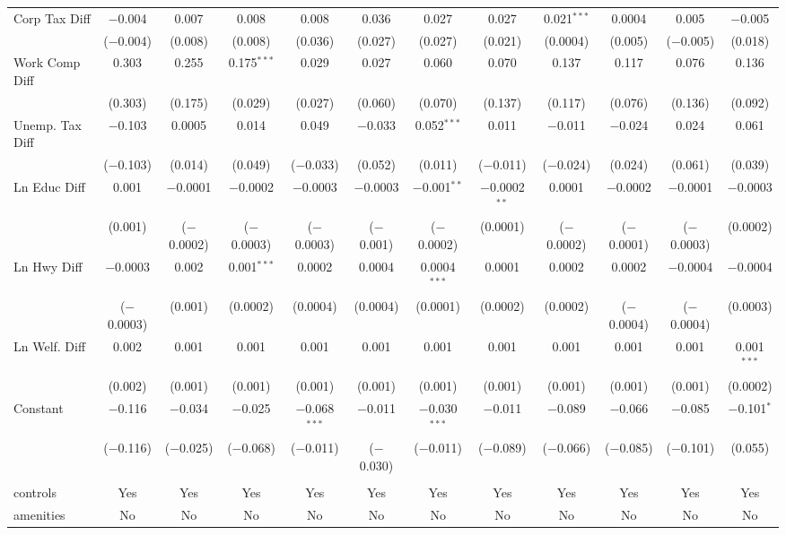 \begin{table}[!htbp]
\begin{tabular}{@{\extracolsep{5pt}}lccccccccccc}
  Corp Tax Diff & $-$0.004 & 0.007 & 0.008 & 0.008 & 0.036 & 0.027 & 0.027 & 0.021$^{***}$ & 0.0004 & 0.005 & $-$0.005 \\ 
  & ($-$0.004) & (0.008) & (0.008) & (0.036) & (0.027) & (0.027) & (0.021) & (0.0004) & (0.005) & ($-$0.005) & (0.018) \\ 
  Work Comp Diff & 0.303 & 0.255 & 0.175$^{***}$ & 0.029 & 0.027 & 0.060 & 0.070 & 0.137 & 0.117 & 0.076 & 0.136 \\ 
  & (0.303) & (0.175) & (0.029) & (0.027) & (0.060) & (0.070) & (0.137) & (0.117) & (0.076) & (0.136) & (0.092) \\ 
  Unemp. Tax Diff & $-$0.103 & 0.0005 & 0.014 & 0.049 & $-$0.033 & 0.052$^{***}$ & 0.011 & $-$0.011 & $-$0.024 & 0.024 & 0.061 \\ 
  & ($-$0.103) & (0.014) & (0.049) & ($-$0.033) & (0.052) & (0.011) & ($-$0.011) & ($-$0.024) & (0.024) & (0.061) & (0.039) \\ 
  Ln Educ Diff & 0.001 & $-$0.0001 & $-$0.0002 & $-$0.0003 & $-$0.0003 & $-$0.001$^{**}$ & $-$0.0002$^{**}$ & 0.0001 & $-$0.0002 & $-$0.0001 & $-$0.0003 \\ 
  & (0.001) & ($-$0.0002) & ($-$0.0003) & ($-$0.0003) & ($-$0.001) & ($-$0.0002) & (0.0001) & ($-$0.0002) & ($-$0.0001) & ($-$0.0003) & (0.0002) \\ 
  Ln Hwy Diff & $-$0.0003 & 0.002 & 0.001$^{***}$ & 0.0002 & 0.0004 & 0.0004$^{***}$ & 0.0001 & 0.0002 & 0.0002 & $-$0.0004 & $-$0.0004 \\ 
  & ($-$0.0003) & (0.001) & (0.0002) & (0.0004) & (0.0004) & (0.0001) & (0.0002) & (0.0002) & ($-$0.0004) & ($-$0.0004) & (0.0003) \\ 
  Ln Welf. Diff & 0.002 & 0.001 & 0.001 & 0.001 & 0.001 & 0.001 & 0.001 & 0.001 & 0.001 & 0.001 & 0.001$^{***}$ \\ 
  & (0.002) & (0.001) & (0.001) & (0.001) & (0.001) & (0.001) & (0.001) & (0.001) & (0.001) & (0.001) & (0.0002) \\ 
  Constant & $-$0.116 & $-$0.034 & $-$0.025 & $-$0.068$^{***}$ & $-$0.011 & $-$0.030$^{***}$ & $-$0.011 & $-$0.089 & $-$0.066 & $-$0.085 & $-$0.101$^{*}$ \\ 
  & ($-$0.116) & ($-$0.025) & ($-$0.068) & ($-$0.011) & ($-$0.030) & ($-$0.011) & ($-$0.089) & ($-$0.066) & ($-$0.085) & ($-$0.101) & (0.055) \\ 
 \hline \\[-1.8ex] 
controls & Yes & Yes & Yes & Yes & Yes & Yes & Yes & Yes & Yes & Yes & Yes \\ 
amenities & No & No & No & No & No & No & No & No & No & No & No \\ 

\end{tabular}
\end{table}
